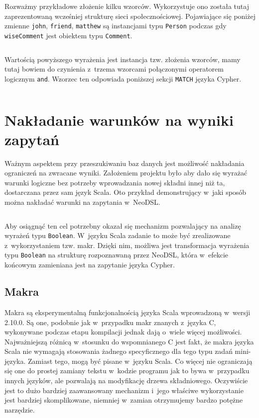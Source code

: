 \documentclass[brudnopis]{xmgr}
\begin{document}
Rozważmy przykładowe złożenie kilku wzorców. Wykorzystuje ono została tutaj zaprezentowaną wcześniej strukturę sieci społecznościowej. Pojawiające się poniżej zmienne \texttt{john}, \texttt{friend}, \texttt{matthew} są instancjami typu \texttt{Person} podczas gdy \texttt{wiseComment} jest obiektem typu \texttt{Comment}.

\inputminted{scala}{listings/scala/dsl/patterns/functional-example-1.scala}

Wartością powyższego wyrażenia jest instancja tzw. złożenia wzorców, mamy tutaj bowiem do czynienia z~trzema wzorcami połączonymi operatorem logicznym \texttt{and}. Wzorzec ten odpowiada poniższej sekcji \texttt{MATCH} języka Cypher.

\inputminted{cypher}{listings/cypher/patterns-dsl-example.cypher}

\section{Nakładanie warunków na wyniki zapytań}

Ważnym aspektem przy przeszukiwaniu baz danych jest możliwość nakładania ograniczeń na zwracane wyniki. Założeniem projektu było aby dało się wyrażać warunki logiczne bez potrzeby wprowadzania nowej składni innej niż ta, dostarczana przez sam język Scala. Oto przykład demonstrujący w~jaki sposób można nakładać warunki na zapytania w~NeoDSL.

\inputminted{scala}{listings/scala/dsl/query-with-simple-condition.scala}

Aby osiągnąć ten cel potrzebny okazał się mechanizm pozwalający na analizę wyrażeń typu \texttt{Boolean}. W~języku Scala zadanie to może być zrealizowane z~wykorzystaniem tzw. makr. 
Dzięki nim, możliwa jest transformacja wyrażenia typu \texttt{Boolean} na strukturę rozpoznawaną przez NeoDSL, która w~efekcie końcowym zamieniana jest na zapytanie języka Cypher.

\subsection{Makra}

Makra są eksperymentalną funkcjonalnością języka Scala wprowadzoną w~wersji 2.10.0. Są one, podobnie jak w~przypadku makr znanych z~języka C, wykonywane podczas etapu kompilacji jednak dają o~wiele więcej możliwości. Najważniejszą różnicą w~stosunku do wspomnianego C jest fakt, że makra języka Scala nie wymagają stosowania żadnego specyficznego dla tego typu zadań mini-języka. Zamiast tego, mogą być pisane w~języku Scala. Co więcej nie ograniczają się one do prostej zamiany tekstu w~kodzie programu jak to bywa w~przypadku innych języków, ale pozwalają na modyfikację drzewa składniowego. Oczywiście jest to dużo bardziej zaawansowany mechanizm i~jego właściwe wykorzystanie jest bardziej skomplikowane, niemniej w~zamian otrzymujemy bardzo potężne narzędzie.
\end{document}
